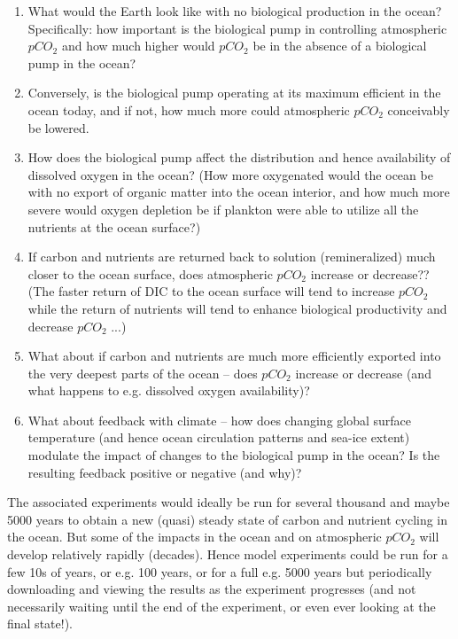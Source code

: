 \documentclass[11pt,fleqn]{book} %
\begin{document}
\begin{enumerate}[noitemsep]
\vspace{1mm}
\item What would the Earth look like with no biological production in the ocean? Specifically: how important is the biological pump in controlling atmospheric \(pCO_{2}\) and how much higher would \(pCO_{2}\) be in the absence of a biological pump in the ocean?
\vspace{1mm}
\item Conversely, is the biological pump operating at its maximum efficient in the ocean today, and if not, how much more could atmospheric \(pCO_{2}\) conceivably be lowered.
\vspace{1mm}
\item How does the biological pump affect the distribution and hence availability of dissolved oxygen in the ocean? (How more oxygenated would the ocean be with no export of organic matter into the ocean interior, and how much more severe would oxygen depletion be if plankton were able to utilize all the nutrients at the ocean surface?)
\vspace{1mm}
\item If carbon and nutrients are returned back to solution (remineralized) much closer to the ocean surface, does atmospheric \(pCO_{2}\) increase or decrease?? (The faster return of DIC to the ocean surface will tend to increase \(pCO_{2}\) while the return of nutrients will tend to enhance biological productivity and decrease \(pCO_{2}\) ...)
\vspace{1mm}
\item What about if carbon and nutrients are much more efficiently exported into the very deepest parts of the ocean -- does \(pCO_{2}\) increase or decrease (and what happens to e.g. dissolved oxygen availability)?
\vspace{1mm}
\item What about feedback with climate -- how does changing global surface temperature (and hence ocean circulation patterns and sea-ice extent) modulate the impact of changes to the biological pump in the ocean? Is the resulting feedback positive or negative (and why)?
\end{enumerate}
\vspace{1mm}

The associated experiments would ideally be run for several thousand and maybe 5000 years to obtain a new (quasi) steady state of carbon and nutrient cycling in the ocean. But some of the impacts in the ocean and on atmospheric \(pCO_{2}\) will develop relatively rapidly (decades). Hence model experiments could be run for a few 10s of years, or e.g. 100 years, or for a full e.g. 5000 years but periodically downloading and viewing the results as the experiment progresses (and not necessarily waiting until the end of the experiment, or even ever looking at the final state!).
\end{document}

